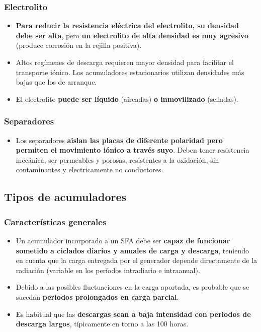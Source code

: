 \documentclass[serif, xcolor=dvipsnames]{beamer}
\begin{document}
\begin{frame}
\frametitle{Electrolito}
\begin{itemize}
\item \textbf{Para reducir la resistencia eléctrica del electrolito, su
densidad debe ser alta}, pero \textbf{un electrolito de alta densidad
es muy agresivo} (produce corrosión en la rejilla positiva). 
\item Altos regímenes de descarga requieren mayor densidad para facilitar
el transporte iónico. Los acumuladores estacionarios utilizan densidades
más bajas que los de arranque. 
\item El electrolito \textbf{puede ser líquido} (aireadas) \textbf{o inmovilizado}
(selladas).
\end{itemize}

\end{frame}

\begin{frame}
\frametitle{Separadores}
\begin{itemize}
\item Los separadores \textbf{aislan las placas de diferente polaridad pero
permiten el movimiento iónico a través suyo}. Deben tener resistencia
mecánica, ser permeables y porosas, resistentes a la oxidación, sin
contaminantes y electricamente no conductores.
\end{itemize}

\end{frame}

\subsection{Tipos de acumuladores}


\begin{frame}
\frametitle{Características generales}
\begin{itemize}
\item Un acumulador incorporado a un SFA debe ser \textbf{capaz de funcionar
sometido a ciclados diarios y anuales de carga y descarga}, teniendo
en cuenta que la carga entregada por el generador depende directamente
de la radiación (variable en los períodos intradiario e intraanual). 
\item Debido a las posibles fluctuaciones en la carga aportada, es probable
que se sucedan \textbf{periodos prolongados en carga parcial}. 
\item Es habitual que las \textbf{descargas sean a baja intensidad con periodos
de descarga largos}, típicamente en torno a las 100 horas.
\end{itemize}

\end{frame}
\end{document}
